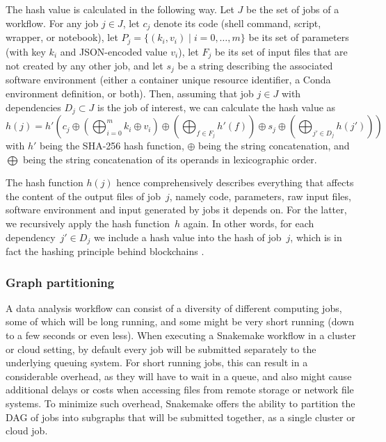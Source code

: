 \documentclass[parskip=half]{scrartcl}
\begin{document}
The hash value is calculated in the following way.
Let $J$ be the set of jobs of a workflow.
For any job $j \in J$, let $c_j$ denote its code (shell command, script, wrapper, or notebook), let $P_j = \{(k_i, v_i) \mid i=0,\dots,m\}$ be its set of parameters (with key $k_i$ and JSON-encoded value $v_i$), let $F_j$ be its set of input files that are not created by any other job, and let $s_j$ be a string describing the associated software environment (either a container unique resource identifier, a Conda environment definition, or both).
Then, assuming that job $j \in J$ with dependencies $D_j \subset J$ is the job of interest, we can calculate the hash value as $$ h(j) = h'\left( c_j \oplus \left(\bigoplus_{i=0}^m k_i \oplus v_i \right) \oplus \left( \bigoplus_{f \in F_j} h'(f) \right) \oplus s_j \oplus \left( \bigoplus_{j' \in D_j} h(j') \right) \right) $$ with $h'$ being the SHA-256 \parencite{Handschuh} hash function, $\oplus$ being the string concatenation, and $\bigoplus$ being the string concatenation of its operands in lexicographic order.

The hash function $h(j)$ hence comprehensively describes everything that affects the content of the output files of job~\(j\), namely code, parameters, raw input files, software environment and input generated by jobs it depends on.
For the latter, we recursively apply the hash function~\(h\) again.
In other words, for each dependency~\(j' \in D_j\) we include a hash value into the hash of job~\(j\), which is in fact the hashing principle behind blockchains \parencite{narayanan_bitcoin_2016}.

\subsubsection{Graph partitioning}\label{sec:partitioning}

A data analysis workflow can consist of a diversity of different computing jobs, some of which will be long running, and some might be very short running (down to a few seconds or even less).
When executing a Snakemake workflow in a cluster or cloud setting, by default every job will be submitted separately to the underlying queuing system.
For short running jobs, this can result in a considerable overhead, as they will have to wait in a queue, and also might cause additional delays or costs when accessing files from remote storage or network file systems.
To minimize such overhead, Snakemake offers the ability to partition the DAG of jobs into subgraphs that will be submitted together, as a single cluster or cloud job.
\end{document}
